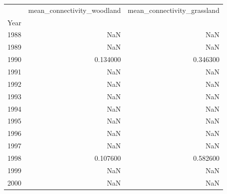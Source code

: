 \begin{tabular}{lrr}
\toprule
 & mean_connectivity_woodland & mean_connectivity_grassland \\
Year &  &  \\
\midrule
1988 & NaN & NaN \\
1989 & NaN & NaN \\
1990 & 0.134000 & 0.346300 \\
1991 & NaN & NaN \\
1992 & NaN & NaN \\
1993 & NaN & NaN \\
1994 & NaN & NaN \\
1995 & NaN & NaN \\
1996 & NaN & NaN \\
1997 & NaN & NaN \\
1998 & 0.107600 & 0.582600 \\
1999 & NaN & NaN \\
2000 & NaN & NaN \\
\bottomrule
\end{tabular}
